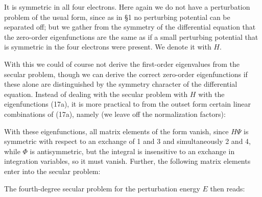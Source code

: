 \begin{paper}{1}
It is symmetric in all four electrons. Here again we do not have a perturbation problem of the usual form, since as in \S1 no perturbing potential can be separated off; but we gather from the symmetry of the differential equation that the zero-order eigenfunctions are the same as if a small perturbing potential that is symmetric in the four electrons were present. We denote it with $H$.

With this we could of course not derive the first-order eigenvalues from the secular problem, though we can derive the correct zero-order eigenfunctions if these alone are distinguished by the symmetry character of the differential equation. Instead of dealing with the secular problem with $H$ with the eigenfunctions (17a), it is more practical to from the outset form certain linear combinations of (17a), namely (we leave off the normalization factors):

With these eigenfunctions, all matrix elements of the form
vanish, since $H\Psi$ is symmetric with respect to an exchange of 1 and 3 and simultaneously 2 and 4, while $\Phi$ is antisymmetric, but the integral is insensitive to an exchange in integration variables, so it must vanish. Further, the following matrix elements enter into the secular problem:

The fourth-degree secular problem for the perturbation energy $E$ then reads:


\end{paper}
